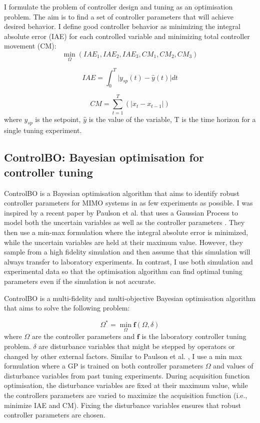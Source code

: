 I formulate the problem of controller design and tuning as an optimisation problem. The aim is to find a set of controller parameters that will achieve desired behavior. I define good controller behavior as minimizing the integral absolute error (IAE) for each controlled variable and minimizing total controller movement (CM):
\begin{equation}
    \min_{\Omega}(IAE_1, IAE_2, IAE_3, CM_1, CM_2, CM_3)
\end{equation}


\begin{equation}
    IAE = \int_0^T \vert y_{sp}(t) - \hat y(t) \vert dt
\end{equation}

\begin{equation}
    CM = \sum_{t=1}^{T}( \vert x_t - x_{t-1} \vert)
\end{equation}
where $y_{sp}$ is the setpoint,  $\hat y$  is the value of  the variable, T is the time horizon for a single tuning experiment. 

\subsection{ControlBO: Bayesian optimisation for controller tuning}

ControlBO is a Bayesian optimisation algorithm that aims to identify robust controller parameters for MIMO systems in as few experiments as possible. I was inspired by a recent paper by Paulson et al. that uses a Gaussian Process to model both the uncertain variables as well as the controller parameters \cite{Paulson2022}. They then use a min-max formulation where the integral absolute error is minimized, while the uncertain variables are held at their maximum value. However, they sample from a high fidelity simulation and then assume that this simulation will always transfer to laboratory experiments. In contrast, I use both simulation and experimental data so that the optimisation algorithm can find optimal tuning parameters even if the simulation is not accurate.

ControlBO is a multi-fidelity and multi-objective Bayesian optimisation algorithm that aims to solve the following problem:

\begin{equation}
    \Omega^* = \min_{\Omega} \mathbf f(\Omega, \delta)
\end{equation}
where $\Omega$ are the controller parameters and $\mathbf f$ is the laboratory controller tuning problem. $\delta$ are disturbance variables that might be stepped by operators or changed by other external factors. Similar to Paulson et al. \cite{Paulson2022}, I use a min max formulation where a GP is trained on both controller parameters $\Omega$ and values of disturbance variables from past tuning experiments. During acquisition function optimisation, the disturbance variables are fixed at their maximum value, while the controllers parameters are varied to maximize the acquisition function (i.e., minimize IAE and CM). Fixing the disturbance variables ensures that robust controller parameters are chosen.

